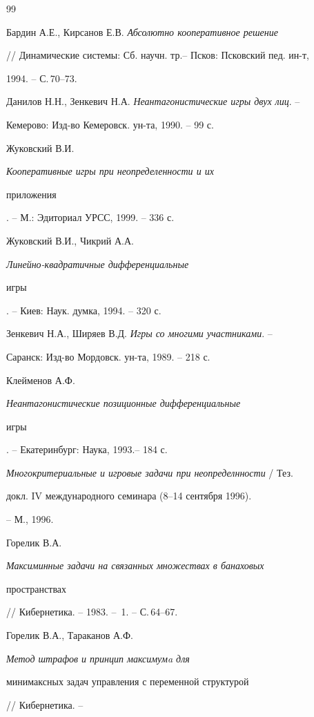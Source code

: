 \begin{thebibliography}{99} 


 




Бардин А.Е., Кирсанов Е.В. {\em Абсолютно кооперативное решение} 


// Динамические системы: Сб. научн. тр.-- Псков: Псковский пед. ин-т, 


1994. -- С.\,70--73. 




Данилов Н.Н., Зенкевич Н.А. {\em Неантагонистические игры двух лиц}. -- 


Кемерово: Изд-во Кемеровск. ун-та, 1990. -- 99 с. 




Жуковский В.И. {\em Кооперативные игры при неопределенности и их 


приложения}. -- М.: Эдиториал УРСС, 1999. -- 336 с. 




Жуковский В.И., Чикрий А.А. {\em Линейно-квадратичные дифференциальные 


игры}. -- Киев: Наук. думка, 1994. -- 320 с. 




Зенкевич Н.А., Ширяев В.Д. {\em Игры со многими участниками}. -- 


Саранск: Изд-во Мордовск. ун-та, 1989. -- 218 с. 




Клейменов А.Ф. {\em Неантагонистические позиционные дифференциальные 


игры}. -- Екатеринбург: Наука, 1993.-- 184 с. 




{\em Многокритериальные и игровые задачи при неопределнности} / Тез. 


докл. IV международного семинара (8--14 сентября 1996). 


-- М., 1996.




Горелик В.А. {\em Максиминные задачи на связанных множествах в банаховых 


пространствах} // Кибернетика. -- 1983. -- \No\,1. -- С.\,64--67. 




Горелик В.А., Тараканов А.Ф. {\em Метод штрафов и принцип максимумa для 


минимаксных задач управления с переменной структурой} // Кибернетика. -- 



\end{thebibliography}

